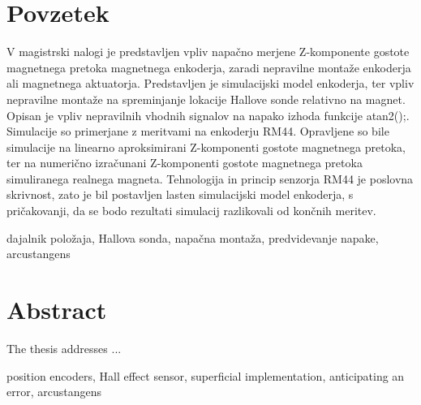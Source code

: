 \documentclass[a4paper,twoside,openright,12pt]{book}
\begin{document}
\chapter*{Povzetek}
V magistrski nalogi je predstavljen vpliv napačno merjene Z-komponente gostote magnetnega pretoka magnetnega enkoderja, zaradi nepravilne montaže enkoderja ali magnetnega aktuatorja.
Predstavljen je simulacijski model enkoderja, ter vpliv nepravilne montaže na spreminjanje lokacije Hallove sonde relativno na magnet.
Opisan je vpliv nepravilnih vhodnih signalov na napako izhoda funkcije atan2();.
Simulacije so primerjane z meritvami na enkoderju RM44. 
Opravljene so bile simulacije na linearno aproksimirani Z-komponenti gostote magnetnega pretoka, ter na numerično izračunani Z-komponenti gostote magnetnega pretoka simuliranega realnega magneta.
Tehnologija in princip senzorja RM44 je poslovna skrivnost, zato je bil postavljen lasten simulacijski model enkoderja, s pričakovanji, da se  bodo rezultati simulacij  razlikovali od končnih meritev.

\kljucnebesede  dajalnik položaja, Hallova sonda, napačna montaža, predvidevanje napake, arcustangens
\chapter*{Abstract}

The thesis addresses ...

\keywords position encoders, Hall effect sensor, superficial implementation, anticipating an error, arcustangens









\end{document}
